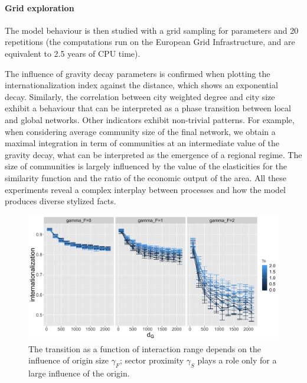 \documentclass[11pt]{article}
\begin{document}
\paragraph{Grid exploration}

The model behaviour is then studied with a grid sampling for parameters and 20 repetitions (the computations run on the European Grid Infrastructure, and are equivalent to 2.5 years of CPU time).

The influence of gravity decay parameters is confirmed when plotting the internationalization index against the distance, which shows an exponential decay. Similarly, the correlation between city weighted degree and city size exhibit a behaviour that can be interpreted as a phase transition between local and global networks. Other indicators exhibit non-trivial patterns. For example, when considering average community size of the final network, we obtain a maximal integration in term of communities at an intermediate value of the gravity decay, what can be interpreted as the emergence of a regional regime. The size of communities is largely influenced by the value of the elasticities for the similarity function and the ratio of the economic output of the area. All these experiments reveal a complex interplay between processes and how the model produces diverse stylized facts.

\begin{figure}
    \includegraphics[width=\textwidth]{figures/internationalization_countryGravityDecay200_gammaDestination0_facetwrapgammaOrigin_colorgammaSectors.png}
    \caption{The transition as a function of interaction range depends on the influence of origin size $\gamma_F$; sector proximity $\gamma_S$ plays a role only for a large influence of the origin.}
\end{figure}
\end{document}

